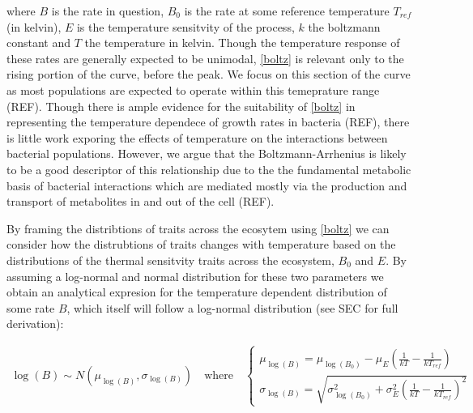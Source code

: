 \documentclass{article}
\begin{document}
where $B$ is the rate in question, $B_0$ is the rate at some reference temperature $T_{ref}$ (in kelvin), $E$ is the temperature sensitvity of the process, $k$ the boltzmann constant and $T$ the temperature in kelvin. Though the temperature response of these rates are generally expected to be unimodal, \cref{boltz} is relevant only to the rising portion of the curve, before the peak. We focus on this section of the curve as most populations are expected to operate within this temeprature range (REF). Though there is ample evidence for the suitability of \cref{boltz} in representing the temperature dependece of growth rates in bacteria (REF), there is little work exporing the effects of temperature on the interactions between bacterial populations. However, we argue that the Boltzmann-Arrhenius is likely to be a good descriptor of this relationship due to the the fundamental metabolic basis of bacterial interactions which are mediated mostly via the production and transport of metabolites in and out of the cell (REF).

By framing the distribtions of traits across the ecosytem using \cref{boltz} we can consider how the distrubtions of traits changes with temperature based on the distributions of the thermal sensitvity traits across the ecosystem, $B_0$ and $E$. By assuming a log-normal and normal distribution for these two parameters we obtain an analytical expresion for the temperature dependent distribution of some rate $B$, which itself will follow a log-normal distribution (see SEC for full derivation):

\begin{align}
  \log(B) \sim N(\mu_{\log(B)},\sigma_{\log(B)}) \quad \text{where} \quad
    \begin{cases}
      \mu_{\log(B)} = \mu_{\log(B_0)} - \mu_E \left(\frac{1}{k T} - \frac{1}{k T_{ref}} \right)
      \\
      \sigma_{\log(B)} =\sqrt{\sigma_{\log(B_0)}^2 + \sigma_E^2 \left(\frac{1}{kT} - \frac{1}{kT_{ref}} \right)^2} \label{Temp_dis}
      \end{cases}
\end{align}
\end{document}
